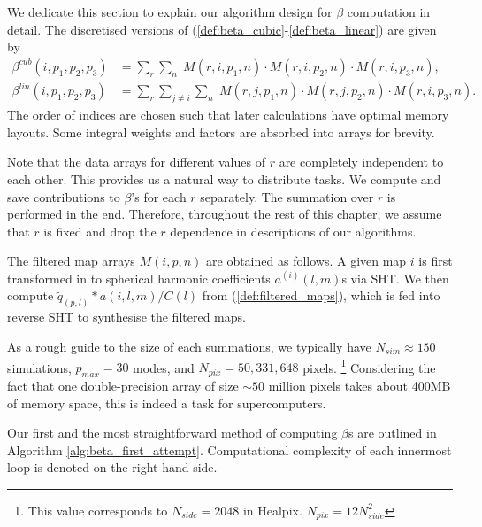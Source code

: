 We dedicate this section to explain our algorithm design for $\beta$ computation in detail. The discretised versions of (\ref{def:beta_cubic}-\ref{def:beta_linear}) are given by
\begin{align}
	\beta^{cub}(i, p_1,p_2,p_3) &= \sum_r \sum_n \; M(r, i, p_1, n) \cdot M(r, i, p_2, n) \cdot M(r, i, p_3, n), \\
	\beta^{lin}(i, p_1,p_2,p_3) &= \sum_r \sum_{j \neq i} \sum_n \; M(r, j, p_1, n) \cdot M(r, j, p_2, n) \cdot M(r, i, p_3, n).
\end{align}
The order of indices are chosen such that later calculations have optimal memory layouts. Some integral weights and factors are absorbed into arrays for brevity.

Note that the data arrays for different values of $r$ are completely independent to each other. This provides us a natural way to distribute tasks. We compute and save contributions to $\beta$'s for each $r$ separately. The summation over $r$ is performed in the end. Therefore, throughout the rest of this chapter, we assume that $r$ is fixed and drop the $r$ dependence in descriptions of our algorithms.

The filtered map arrays $M(i,p,n)$ are obtained as follows. A given map $i$ is first transformed in to spherical harmonic coefficients $a^{(i)}(l,m)$s via SHT. We then compute $\tilde{q}_(p,l) * a(i,l,m) / C(l)$ from (\ref{def:filtered_maps}), which is fed into reverse SHT to synthesise the filtered maps.

As a rough guide to the size of each summations, we typically have $N_{sim} \approx 150$ simulations, $p_{max} = 30$ modes, and $N_{pix} = 50,331,648$ pixels. \footnote{This value corresponds to $N_{side} = 2048$ in Healpix. $N_{pix} = 12 N_{side}^2$} Considering the fact that one double-precision array of size $\sim 50$ million pixels takes about 400MB of memory space, this is indeed a task for supercomputers.

Our first and the most straightforward method of computing $\beta$s are outlined in Algorithm \ref{alg:beta_first_attempt}. Computational complexity of each innermost loop is denoted on the right hand side.

